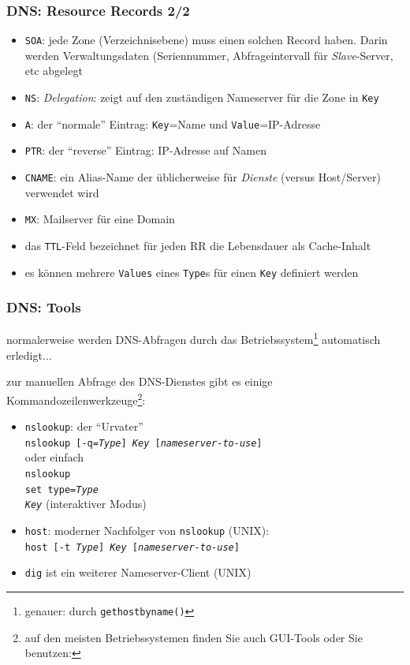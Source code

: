 \documentclass[ignorenonframetext]{beamer}
\begin{document}
\begin{frame}
\frametitle{DNS: Resource Records 2/2}
\begin{itemize}
	\item{\texttt{SOA}: jede Zone (Verzeichnisebene) muss einen solchen Record haben. Darin werden Verwaltungsdaten (Seriennummer, Abfrageintervall f\"ur {\em Slave}-Server, etc abgelegt}
	\item{\texttt{NS}: {\em Delegation}: zeigt auf den zust\"andigen Nameserver f\"ur die Zone in \texttt{Key}}
	\item{\texttt{A}: der ``normale'' Eintrag: \texttt{Key}=Name und \texttt{Value}=IP-Adresse}
	\item{\texttt{PTR}: der ``reverse'' Eintrag: IP-Adresse auf Namen}
	\item{\texttt{CNAME}: ein Alias-Name der \"ublicherweise f\"ur {\em Dienste} (versus Host/Server) verwendet wird}
	\item{\texttt{MX}: Mailserver f\"ur eine Domain}
	\item{das \texttt{TTL}-Feld bezeichnet f\"ur jeden RR die Lebensdauer als Cache-Inhalt}
	\item{es k\"onnen mehrere \texttt{Values} eines \texttt{Type}s f\"ur einen \texttt{Key} definiert werden}
\end{itemize}
\end{frame}




\begin{frame}
\frametitle{DNS: Tools}
normalerweise werden DNS-Abfragen durch das Betriebssystem\footnote{genauer: durch \texttt{gethostbyname()}} automatisch erledigt$\ldots$

zur manuellen Abfrage des DNS-Dienstes gibt es einige Kommandozeilenwerkzeuge\footnote{auf den meisten Betriebssystemen finden Sie auch GUI-Tools oder Sie benutzen: }:
\begin{itemize}
	\item{\texttt{nslookup}: der ``Urvater''\\ \texttt{nslookup [-q={\em Type}] {\em Key} [{\em nameserver-to-use}]}}\\ oder einfach\\ \texttt{nslookup\\set type={\em Type}\\{\em Key}} (interaktiver Modus)
	\item{\texttt{host}: moderner Nachfolger von \texttt{nslookup} (UNIX):\\ \texttt{host [-t {\em Type}] {\em Key} [{\em nameserver-to-use}]}}
	\item{\texttt{dig} ist ein weiterer Nameserver-Client (UNIX)}
\end{itemize}
\end{frame}
\end{document}
